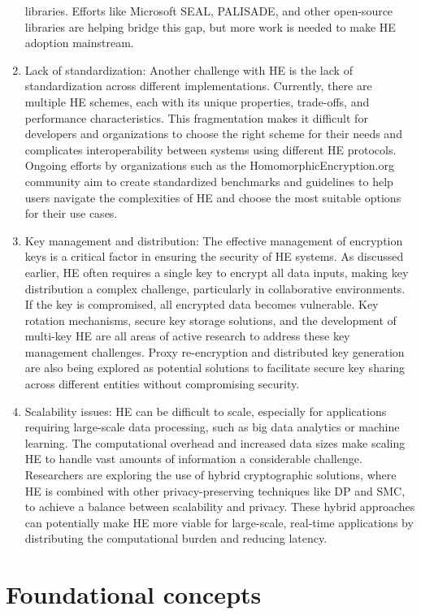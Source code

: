 \documentclass[
  letterpaper,
  DIV=11,
  numbers=noendperiod,
  oneside]{scrartcl}
\begin{document}
\begin{enumerate}
  libraries. Efforts like Microsoft SEAL, PALISADE, and other
  open-source libraries are helping bridge this gap, but more work is
  needed to make HE adoption mainstream.
\item
  Lack of standardization: Another challenge with HE is the lack of
  standardization across different implementations. Currently, there are
  multiple HE schemes, each with its unique properties, trade-offs, and
  performance characteristics. This fragmentation makes it difficult for
  developers and organizations to choose the right scheme for their
  needs and complicates interoperability between systems using different
  HE protocols. Ongoing efforts by organizations such as the
  HomomorphicEncryption.org community aim to create standardized
  benchmarks and guidelines to help users navigate the complexities of
  HE and choose the most suitable options for their use cases.
\item
  Key management and distribution: The effective management of
  encryption keys is a critical factor in ensuring the security of HE
  systems. As discussed earlier, HE often requires a single key to
  encrypt all data inputs, making key distribution a complex challenge,
  particularly in collaborative environments. If the key is compromised,
  all encrypted data becomes vulnerable. Key rotation mechanisms, secure
  key storage solutions, and the development of multi-key HE are all
  areas of active research to address these key management challenges.
  Proxy re-encryption and distributed key generation are also being
  explored as potential solutions to facilitate secure key sharing
  across different entities without compromising security.
\item
  Scalability issues: HE can be difficult to scale, especially for
  applications requiring large-scale data processing, such as big data
  analytics or machine learning. The computational overhead and
  increased data sizes make scaling HE to handle vast amounts of
  information a considerable challenge. Researchers are exploring the
  use of hybrid cryptographic solutions, where HE is combined with other
  privacy-preserving techniques like DP and SMC, to achieve a balance
  between scalability and privacy. These hybrid approaches can
  potentially make HE more viable for large-scale, real-time
  applications by distributing the computational burden and reducing
  latency.
\end{enumerate}

\section{Foundational concepts}\label{foundational-concepts}
\end{document}
